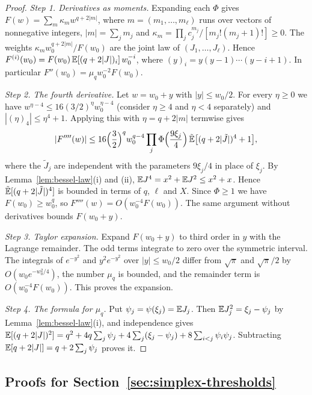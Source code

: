 \begin{proof}
\emph{Step 1. Derivatives as moments.} Expanding each $\Phi$ gives
$F(w)=\sum_m\kappa_mw^{q+2|m|}$, where $m=(m_1,\ldots,m_\ell)$ runs over vectors
of nonnegative integers, $|m|=\sum_jm_j$ and
$\kappa_m=\prod_jc_j^{m_j}/[m_j!(m_j+1)!]\ge0$. The weights
$\kappa_mw_0^{q+2|m|}/F(w_0)$ are the joint law of $(J_1,\ldots,J_\ell)$. Hence
$F^{(i)}(w_0)=F(w_0)\,\mathbb E[(q+2|J|)_i]\,w_0^{-i}$, where
$(y)_i=y(y-1)\cdots(y-i+1)$. In particular $F''(w_0)=\mu_qw_0^{-2}F(w_0)$.

\emph{Step 2. The fourth derivative.} Let $w=w_0+y$ with $|y|\le w_0/2$. For
every $\eta\ge0$ we have $w^{\eta-4}\le16(3/2)^\eta w_0^{\eta-4}$ (consider
$\eta\ge4$ and $\eta<4$ separately) and $|(\eta)_4|\le\eta^4+1$. Applying this
with $\eta=q+2|m|$ termwise gives
\[
|F''''(w)|\le16\Bigl(\frac32\Bigr)^qw_0^{q-4}
\prod_j\Phi\Bigl(\frac{9\xi_j}4\Bigr)\,
\tilde{\mathbb E}\bigl[(q+2|\tilde J|)^4+1\bigr],
\]
where the $\tilde J_j$ are independent with the parameters $9\xi_j/4$ in place of
$\xi_j$. By Lemma~\ref{lem:bessel-law}(i) and (ii),
$\mathbb E J^4=x^2+\mathbb E J^2\le x^2+x$. Hence $\tilde{\mathbb E}[(q+2|\tilde J|)^4]$ is bounded in
terms of $q$, $\ell$ and $X$. Since $\Phi\ge1$ we have $F(w_0)\ge w_0^q$, so
$F''''(w)=O(w_0^{-4}F(w_0))$. The same argument without derivatives bounds
$F(w_0+y)$.

\emph{Step 3. Taylor expansion.} Expand $F(w_0+y)$ to third order in $y$ with
the Lagrange remainder. The odd terms integrate to zero over the symmetric
interval. The integrals of $e^{-y^2}$ and $y^2e^{-y^2}$ over $|y|\le w_0/2$
differ from $\sqrt\pi$ and $\sqrt\pi/2$ by $O(w_0e^{-w_0^2/4})$, the number
$\mu_q$ is bounded, and the remainder term is $O(w_0^{-4}F(w_0))$. This proves
the expansion.

\emph{Step 4. The formula for $\mu_q$.} Put $\psi_j=\psi(\xi_j)=\mathbb E J_j$. Then
$\mathbb E J_j^2=\xi_j-\psi_j$ by Lemma~\ref{lem:bessel-law}(i), and independence gives
$\mathbb E[(q+2|J|)^2]=q^2+4q\sum_j\psi_j+4\sum_j(\xi_j-\psi_j)+8\sum_{i<j}\psi_i\psi_j$.
Subtracting $\mathbb E[q+2|J|]=q+2\sum_j\psi_j$ proves it.
\end{proof}

\subsection{Proofs for Section~\ref{sec:simplex-thresholds}}

